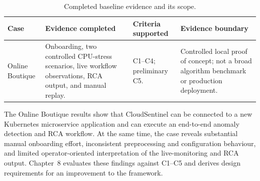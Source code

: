 \begin{table}[htbp]
    \centering
    \small
    \caption{Completed baseline evidence and its scope.}
    \label{tab:baseline_evidence_summary}
    \begin{tabular}{p{} p{} p{} p{}}
        \toprule
        \textbf{Case} & \textbf{Evidence completed} & \textbf{Criteria supported} & \textbf{Evidence boundary} \\
        \midrule
        Online Boutique & Onboarding, two controlled CPU-stress scenarios, live workflow observations, RCA output, and manual replay. & C1--C4; preliminary C5. & Controlled local proof of concept; not a broad algorithm benchmark or production deployment. \\
        \bottomrule
    \end{tabular}
\end{table}

The Online Boutique results show that CloudSentinel can be connected to a new Kubernetes microservice application and can execute an end-to-end anomaly detection and RCA workflow. At the same time, the case reveals substantial manual onboarding effort, inconsistent preprocessing and configuration behaviour, and limited operator-oriented interpretation of the live-monitoring and RCA output. Chapter~8 evaluates these findings against C1--C5 and derives design requirements for an improvement to the framework.
